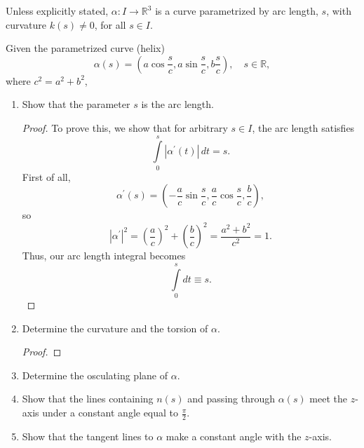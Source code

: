 \documentclass[12pt]{article}
\newenvironment{problem}[2][Problem]{\begin{trivlist}
    \item[\hskip \labelsep {\bfseries #1}\hskip \labelsep {\bfseries #2.}]}{\end{trivlist}}
\theoremstyle{definition}
\begin{document}
Unless explicitly stated, \(\alpha: I \rightarrow \mathbb{R}^3\) is a curve parametrized by arc length, \( s \), with curvature \( k(s) \neq 0 \), for all \( s \in I \).

\begin{problem}{1.5.1}
  Given the parametrized curve (helix)
  \begin{equation}
  \label{eq:1}
  \alpha(s) = \left( a \cos \frac{s}{c}, a \sin \frac{s}{c}, b \frac{s}{c} \right), \quad s \in \mathbb{R},
  \end{equation}
  where \( c^2 = a^2 + b^2 \),

  \begin{enumerate}[label=(\alph*)]
    \item Show that the parameter \( s \) is the arc length.
          \begin{proof}
            To prove this, we show that for arbitrary \( s \in I \), the arc length satisfies
            \begin{equation}
            \label{eq:3}
            \int\limits_0^s \left| \alpha^{\prime}(t) \right| \,dt = s.
            \end{equation}
            First of all,
            \begin{equation}
            \label{eq:4}
            \alpha^{\prime}(s) = \left( -\frac{a}{c}\sin \frac{s}{c}, \frac{a}{c}\cos \frac{s}{c}, \frac{b}{c} \right),
            \end{equation}
            so
            \begin{equation}
            \label{eq:5}
            \left| \alpha^{\prime} \right|^2 = \left( \frac{a}{c} \right)^2 + \left( \frac{b}{c} \right)^2 = \frac{a^2 + b^2}{c^2} = 1.
            \end{equation}
            Thus, our arc length integral becomes
            \begin{equation}
            \label{eq:6}
            \int\limits_0^s dt \equiv s.
            \end{equation}
          \end{proof}
    \item Determine the curvature and the torsion of \(\alpha\).
          \begin{proof}

          \end{proof}
    \item Determine the osculating plane of \(\alpha\).
    \item Show that the lines containing \( n(s) \) and passing through \(\alpha(s)\) meet the \( z \)-axis under a constant angle equal to \( \frac{\pi}{2} \).
    \item Show that the tangent lines to \(\alpha\) make a constant angle with the \( z \)-axis.
  \end{enumerate}
\end{problem}
\end{document}

